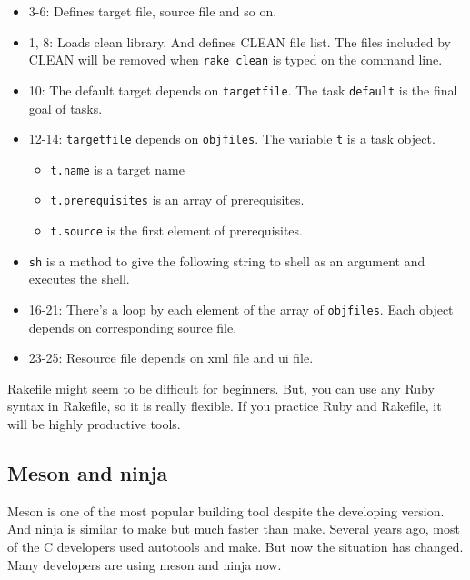\begin{itemize}
\tightlist
\item
  3-6: Defines target file, source file and so on.
\item
  1, 8: Loads clean library. And defines CLEAN file list. The files
  included by CLEAN will be removed when
  \passthrough{\lstinline!rake clean!} is typed on the command line.
\item
  10: The default target depends on
  \passthrough{\lstinline!targetfile!}. The task
  \passthrough{\lstinline!default!} is the final goal of tasks.
\item
  12-14: \passthrough{\lstinline!targetfile!} depends on
  \passthrough{\lstinline!objfiles!}. The variable
  \passthrough{\lstinline!t!} is a task object.

  \begin{itemize}
  \tightlist
  \item
    \passthrough{\lstinline!t.name!} is a target name
  \item
    \passthrough{\lstinline!t.prerequisites!} is an array of
    prerequisites.
  \item
    \passthrough{\lstinline!t.source!} is the first element of
    prerequisites.
  \end{itemize}
\item
  \passthrough{\lstinline!sh!} is a method to give the following string
  to shell as an argument and executes the shell.
\item
  16-21: There's a loop by each element of the array of
  \passthrough{\lstinline!objfiles!}. Each object depends on
  corresponding source file.
\item
  23-25: Resource file depends on xml file and ui file.
\end{itemize}

Rakefile might seem to be difficult for beginners. But, you can use any
Ruby syntax in Rakefile, so it is really flexible. If you practice Ruby
and Rakefile, it will be highly productive tools.

\hypertarget{meson-and-ninja}{%
\subsection{Meson and ninja}\label{meson-and-ninja}}

Meson is one of the most popular building tool despite the developing
version. And ninja is similar to make but much faster than make. Several
years ago, most of the C developers used autotools and make. But now the
situation has changed. Many developers are using meson and ninja now.

